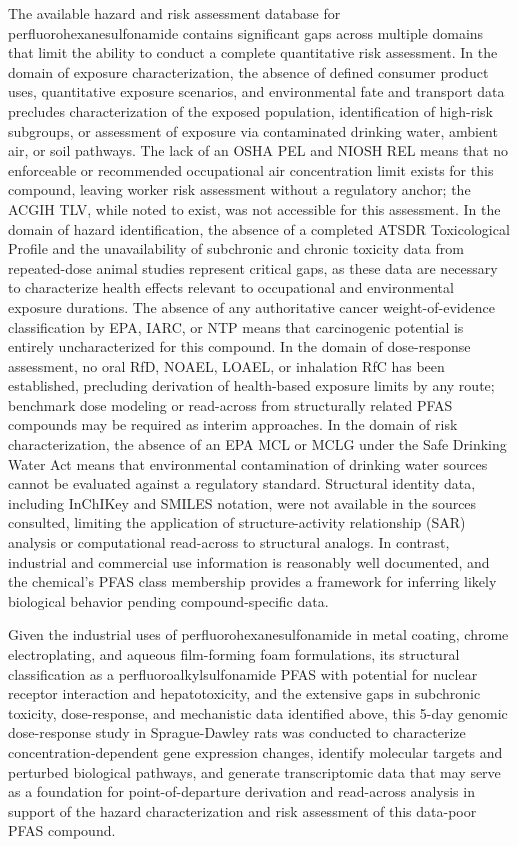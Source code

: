 The available hazard and risk assessment database for perfluorohexanesulfonamide contains significant gaps across multiple domains that limit the ability to conduct a complete quantitative risk assessment. In the domain of exposure characterization, the absence of defined consumer product uses, quantitative exposure scenarios, and environmental fate and transport data precludes characterization of the exposed population, identification of high-risk subgroups, or assessment of exposure via contaminated drinking water, ambient air, or soil pathways. The lack of an OSHA PEL and NIOSH REL means that no enforceable or recommended occupational air concentration limit exists for this compound, leaving worker risk assessment without a regulatory anchor; the ACGIH TLV, while noted to exist, was not accessible for this assessment. In the domain of hazard identification, the absence of a completed ATSDR Toxicological Profile and the unavailability of subchronic and chronic toxicity data from repeated-dose animal studies represent critical gaps, as these data are necessary to characterize health effects relevant to occupational and environmental exposure durations. The absence of any authoritative cancer weight-of-evidence classification by EPA, IARC, or NTP means that carcinogenic potential is entirely uncharacterized for this compound. In the domain of dose-response assessment, no oral RfD, NOAEL, LOAEL, or inhalation RfC has been established, precluding derivation of health-based exposure limits by any route; benchmark dose modeling or read-across from structurally related PFAS compounds may be required as interim approaches. In the domain of risk characterization, the absence of an EPA MCL or MCLG under the Safe Drinking Water Act means that environmental contamination of drinking water sources cannot be evaluated against a regulatory standard. Structural identity data, including InChIKey and SMILES notation, were not available in the sources consulted, limiting the application of structure-activity relationship (SAR) analysis or computational read-across to structural analogs. In contrast, industrial and commercial use information is reasonably well documented, and the chemical's PFAS class membership provides a framework for inferring likely biological behavior pending compound-specific data.

Given the industrial uses of perfluorohexanesulfonamide in metal coating, chrome electroplating, and aqueous film-forming foam formulations, its structural classification as a perfluoroalkylsulfonamide PFAS with potential for nuclear receptor interaction and hepatotoxicity, and the extensive gaps in subchronic toxicity, dose-response, and mechanistic data identified above, this 5-day genomic dose-response study in Sprague-Dawley rats was conducted to characterize concentration-dependent gene expression changes, identify molecular targets and perturbed biological pathways, and generate transcriptomic data that may serve as a foundation for point-of-departure derivation and read-across analysis in support of the hazard characterization and risk assessment of this data-poor PFAS compound.

